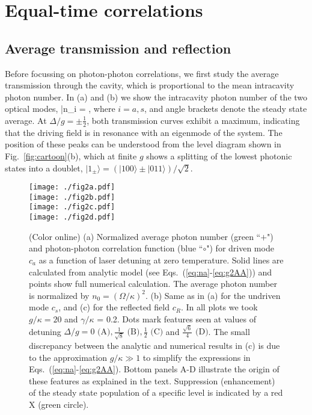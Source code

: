 \section{Equal-time correlations}
\label{sect:Averages}

 
\subsection{Average transmission and reflection}


Before focussing on photon-photon correlations, we first
study
the average transmission through the cavity, which is proportional
to the mean intracavity photon number. In
(a) and (b) we show the 
intracavity photon number of the
two optical modes,
\bel
	\label{eq:nAvg}
	\bar n_i = ,
\eel
where $i =a,s$, and angle brackets denote the steady state average.
At $\Delta/g =
\pm \frac{1}{2}$, both transmission curves exhibit a maximum,
indicating that the driving field is in resonance 
with an eigenmode of the system.
The position of these peaks can be  understood from the level diagram shown
in Fig.~\ref{fig:cartoon}(b), which at finite $g$ shows a splitting
of the lowest photonic states into a doublet, $|1_\pm\rangle=(|100\rangle
\pm|011\rangle)/\sqrt{2}$.
\begin{figure}[tb]
\centering
  \texttt{[image: ./fig2a.pdf]}\\[-0.8cm]
  \texttt{[image: ./fig2b.pdf]}\\[-0.8cm]
  \texttt{[image: ./fig2c.pdf]}\\[0.3cm]
  \texttt{[image: ./fig2d.pdf]}
  \caption{
  \label{fig:spectrum}(Color online)
  (a) Normalized average photon number (green ``$+$")
  and photon-photon correlation function (blue ``$\circ$")
  for driven mode $c_a$
  as a function of laser detuning at zero temperature.
  Solid lines are calculated from analytic model
  (see Eqs.~(\ref{eq:na}-\ref{eq:g2AA}))
  and points show full numerical calculation.
  The average photon number is
  normalized by $n_0 = (\Omega/\kappa)^2$.
  (b) Same as in (a) for the undriven mode $c_s$,
  and
  (c) for the reflected field $c_R$.
  In all plots we took
   $g/\kappa = 20$ and $\gamma/\kappa$ = 0.2.
  Dots mark features seen at values of
  detuning $\Delta/g = 0 \text{ (A)}, \frac{1}{\sqrt{8}} \text{ (B)},
  \frac{1}{2} \text{ (C)}$ and  $\frac{\sqrt{6}}{4} \text{ (D)}$. 
  The
  small discrepancy between the analytic and numerical results
  in (c) is due to the approximation
  $g/\kappa \gg 1$   to  
  simplify the expressions in Eqs.~(\ref{eq:na}-\ref{eq:g2AA}).
  Bottom panels A-D illustrate the origin of these features as explained in the text.
  Suppression  (enhancement) of the
  steady state population of a specific level is
  indicated by a red X (green circle).
  }
\end{figure}
 
